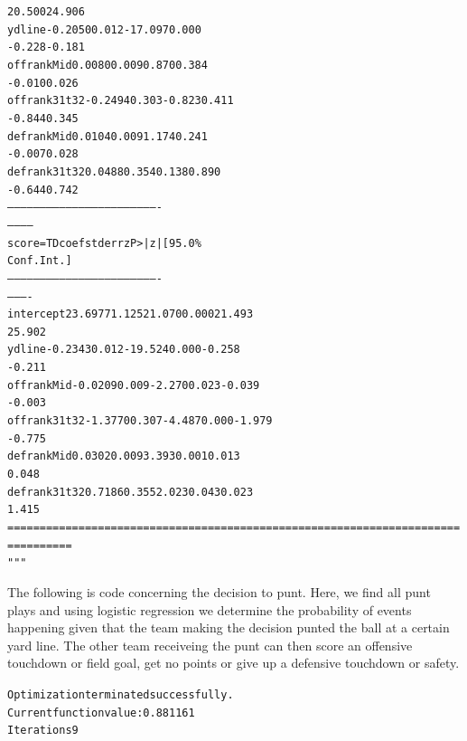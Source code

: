 \documentclass[letterpaper,10pt,english]{/anaconda/lib/python2.7/site-packages/sphinx/texinputs/sphinxhowto}
\newenvironment{InvisibleVerbatim}
        {\begin{mdframed}[leftmargin=0.1\linewidth,innerleftmargin=3pt,innerrightmargin=3pt, userdefinedwidth=1\linewidth, linewidth=0pt, linecolor=white, usetwoside=false]}
        {\end{mdframed}}
\begin{document}
\begin{InvisibleVerbatim}
\begin{alltt}
20.500    24.906
ydline            -0.2050      0.012    -17.097      0.000
-0.228    -0.181
offrankMid         0.0080      0.009      0.870      0.384
-0.010     0.026
offrank31t32      -0.2494      0.303     -0.823      0.411
-0.844     0.345
defrankMid         0.0104      0.009      1.174      0.241
-0.007     0.028
defrank31t32       0.0488      0.354      0.138      0.890
-0.644     0.742
----------------------------------------------------------------------
------------
    score=TD       coef    std err          z      P>|z|      [95.0\%
Conf. Int.]
----------------------------------------------------------------------
----------
intercept       23.6977      1.125     21.070      0.000        21.493
25.902
ydline          -0.2343      0.012    -19.524      0.000        -0.258
-0.211
offrankMid      -0.0209      0.009     -2.270      0.023        -0.039
-0.003
offrank31t32    -1.3770      0.307     -4.487      0.000        -1.979
-0.775
defrankMid       0.0302      0.009      3.393      0.001         0.013
0.048
defrank31t32     0.7186      0.355      2.023      0.043         0.023
1.415
======================================================================
==========
"""\end{alltt}

            \end{InvisibleVerbatim}
            
        
    
The following is code concerning the decision to punt. Here, we find all
punt plays and using logistic regression we determine the probability of
events happening given that the team making the decision punted the ball
at a certain yard line. The other team receiveing the punt can then
score an offensive touchdown or field goal, get no points or give up a
defensive touchdown or safety.

    

        
        

            
                \begin{InvisibleVerbatim}
                \vspace{-0.5\baselineskip}
\begin{alltt}Optimization terminated successfully.
         Current function value: 0.881161
         Iterations 9
\end{alltt}

            \end{InvisibleVerbatim}
            
\end{document}
